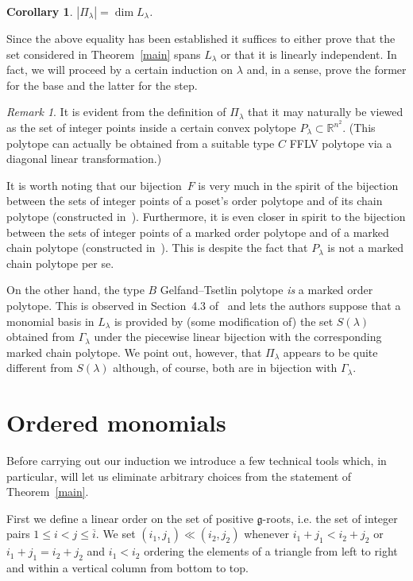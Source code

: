 \documentclass[10pt,a4paper]{article}
\newtheorem{coro}[theo]{Corollary}
\theoremstyle{remark}\newtheorem{rema}[theo]{Remark}
\newcommand{\la}{\lambda}
\begin{document}
\begin{coro}\label{gt}
$|\Pi_\la|=\dim L_\la$.
\end{coro}

Since the above equality has been established it suffices to either prove that the set considered in Theorem~\ref{main} spans $L_\lambda$ or that it is linearly independent. In fact, we will proceed by a certain induction on $\la$ and, in a sense, prove the former for the base and the latter for the step.

\begin{rema}\label{polytope}
It is evident from the definition of $\Pi_\la$ that it may naturally be viewed as the set of integer points inside a certain convex polytope $P_\la\subset\mathbb R^{n^2}$. (This polytope can actually be obtained from a suitable type $C$ FFLV polytope via a diagonal linear transformation.)

It is worth noting that our bijection~$F$ is very much in the spirit of the bijection between the sets of integer points of a poset's order polytope and of its chain polytope (constructed in~\cite{stan}). Furthermore, it is even closer in spirit to the bijection between the sets of integer points of a marked order polytope and of a marked chain polytope (constructed in~\cite{ABS}). This is despite the fact that $P_\la$ is not a marked chain polytope per se.

On the other hand, the type $B$ Gelfand--Tsetlin polytope \emph{is} a marked order polytope. This is observed in Section~4.3 of~\cite{ABS} and lets the authors suppose that a monomial basis in $L_\lambda$ is provided by (some modification of) the set $S(\lambda)$ obtained from $\Gamma_\lambda$ under the piecewise linear bijection with the corresponding marked chain polytope. We point out, however, that $\Pi_\lambda$ appears to be quite different from $S(\lambda)$ although, of course, both are in bijection with $\Gamma_\lambda$.
\end{rema}


\section{Ordered monomials}\label{ordmon}

Before carrying out our induction we introduce a few technical tools which, in particular, will let us eliminate arbitrary choices from the statement of Theorem~\ref{main}.

First we define a linear order on the set of positive $\mathfrak g$-roots, i.e. the set of integer pairs $1\le i<j \le\overline i$. We set $(i_1,j_1)\ll(i_2,j_2)$ whenever $i_1+j_1<i_2+j_2$ or $i_1+j_1=i_2+j_2$ and $i_1<i_2$ ordering the elements of a triangle from left to right and within a vertical column from bottom to top.
\end{document}
